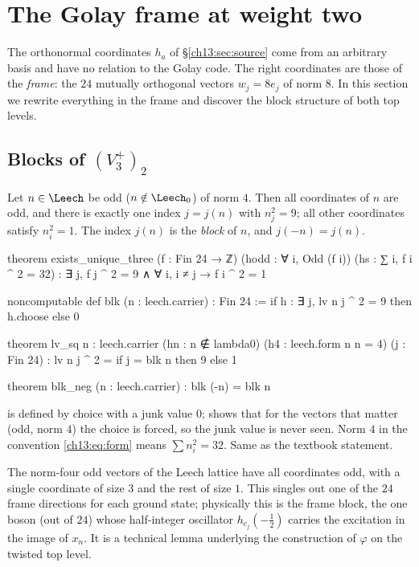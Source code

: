 \section{The Golay frame at weight two}\label{ch13:sec:frame}

The orthonormal coordinates $h_a$ of \S\ref{ch13:sec:source} come from an arbitrary basis and have
no relation to the Golay code. The right coordinates are those of the \emph{frame}: the $24$ mutually
orthogonal vectors $w_j=8e_j$ of norm $8$. In this section we rewrite everything in the frame and
discover the block structure of both top levels.

\subsection{\texorpdfstring{Blocks of $(V_3^+)_2$}{Blocks of (V3+)2}}
\begin{lemma}\label{ch13:lem:blk}
Let $n\in\Leech$ be odd ($n\notin\Leech_0$) of norm $4$. Then all coordinates of $n$ are odd, and there
is exactly one index $j=j(n)$ with $n_j^2=9$; all other coordinates satisfy $n_i^2=1$. The index
$j(n)$ is the \emph{block} of $n$, and $j(-n)=j(n)$.
\end{lemma}
\begin{leancode}
theorem exists_unique_three (f : Fin 24 → ℤ) (hodd : ∀ i, Odd (f i)) (hs : ∑ i, f i ^ 2 = 32) :
    ∃ j, f j ^ 2 = 9 ∧ ∀ i, i ≠ j → f i ^ 2 = 1

noncomputable def blk (n : leech.carrier) : Fin 24 :=
  if h : ∃ j, lv n j ^ 2 = 9 then h.choose else 0

theorem lv_sq {n : leech.carrier} (hn : n ∉ lambda0) (h4 : leech.form n n = 4) (j : Fin 24) :
    lv n j ^ 2 = if j = blk n then 9 else 1

theorem blk_neg (n : leech.carrier) : blk (-n) = blk n
\end{leancode}
\begin{dictionary}
 is defined by choice with a junk value $0$;  shows that for the vectors that
matter (odd, norm $4$) the choice is forced, so the junk value is never seen. Norm $4$ in the
convention \eqref{ch13:eq:form} means $\sum n_i^2=32$. Same as the textbook statement.
\end{dictionary}
\begin{physics}
The norm-four odd vectors of the Leech lattice have all coordinates odd, with a single coordinate of size $3$ and the rest of size $1$. This singles out one of the $24$ frame directions for each ground state; physically this is the frame block, the one boson (out of $24$) whose half-integer oscillator $h_{c_j}(-\tfrac12)$ carries the excitation in the image of $x_n$. It is a technical lemma underlying the construction of $\varphi$ on the twisted top level.
\end{physics}
